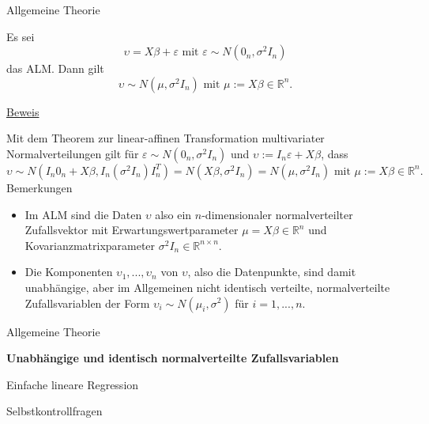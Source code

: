 \documentclass[
  8pt,
  ignorenonframetext,
]{beamer}
\providecommand{\tightlist}{%
  \setlength{\itemsep}{0pt}\setlength{\parskip}{0pt}}
\begin{document}
\begin{frame}{Allgemeine Theorie}
\protect\hypertarget{allgemeine-theorie-2}{}
\footnotesize
\begin{theorem}
\justifying
\normalfont
Es sei
\begin{equation}
\upsilon = X\beta + \varepsilon \mbox{ mit } \varepsilon \sim N(0_n,\sigma^2I_n)
\end{equation}
das ALM. Dann gilt
\begin{equation}
\upsilon \sim N(\mu,\sigma^2I_n) \mbox{ mit } \mu := X\beta \in \mathbb{R}^n.
\end{equation}
\end{theorem}

\underline{Beweis}

Mit dem Theorem zur linear-affinen Transformation multivariater
Normalverteilungen gilt für \(\varepsilon \sim N(0_n,\sigma^2I_n)\) und
\(\upsilon := I_n\varepsilon + X\beta\), dass \begin{equation}
\upsilon \sim N\left(I_n0_n + X\beta, I_n (\sigma^2 I_n) I_n^T\right) = N(X\beta, \sigma^2 I_n) = N(\mu,\sigma^2I_n) \mbox{ mit } \mu := X\beta \in \mathbb{R}^n.
\end{equation} Bemerkungen

\begin{itemize}
\tightlist
\item
  \justifying Im ALM sind die Daten \(\upsilon\) also ein
  \(n\)-dimensionaler normalverteilter Zufallsvektor mit
  Erwartungswertparameter \(\mu = X\beta \in \mathbb{R}^n\) und
  Kovarianzmatrixparameter \(\sigma^2I_n \in \mathbb{R}^{n \times n}\).
\item
  Die Komponenten \(\upsilon_1,...,\upsilon_n\) von \(\upsilon\), also
  die Datenpunkte, sind damit unabhängige, aber im Allgemeinen nicht
  identisch verteilte, normalverteilte Zufallsvariablen der Form
  \(\upsilon_i \sim N\left(\mu_i,\sigma^2\right)\) für \(i = 1,...,n\).
\end{itemize}
\end{frame}

\begin{frame}{}
\protect\hypertarget{section-9}{}
\large
{}
\vfill

Allgemeine Theorie

\textbf{Unabhängige und identisch normalverteilte Zufallsvariablen}

Einfache lineare Regression

Selbstkontrollfragen \vfill
\end{frame}
\end{document}
